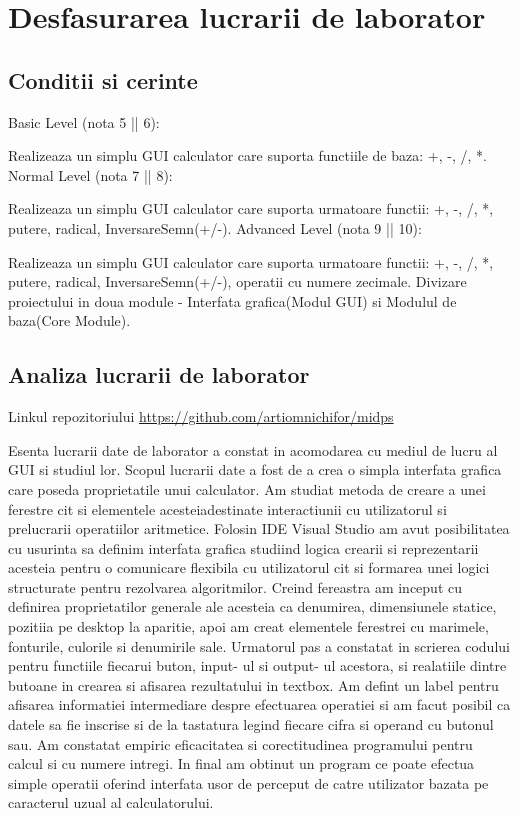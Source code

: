 \section{Desfasurarea lucrarii de laborator}

\subsection{Conditii si cerinte}

Basic Level (nota 5 || 6):

Realizeaza un simplu GUI calculator care suporta functiile de baza: +, -, /, *.
Normal Level (nota 7 || 8):

Realizeaza un simplu GUI calculator care suporta urmatoare functii: +, -, /, *, putere, radical, InversareSemn(+/-).
Advanced Level (nota 9 || 10):

Realizeaza un simplu GUI calculator care suporta urmatoare functii: +, -, /, *, putere, radical, InversareSemn(+/-), operatii cu numere zecimale.
Divizare proiectului in doua module - Interfata grafica(Modul GUI) si Modulul de baza(Core Module).

\subsection{Analiza lucrarii de laborator}
	Linkul repozitoriului  \url{https://github.com/artiomnichifor/midps}

	Esenta lucrarii date de laborator a constat in acomodarea cu mediul de lucru al GUI si studiul lor. Scopul lucrarii date a fost de a crea o simpla interfata grafica care poseda proprietatile unui calculator. Am studiat metoda de creare a unei ferestre cit si elementele acesteiadestinate interactiunii cu utilizatorul si prelucrarii operatiilor aritmetice. Folosin IDE Visual Studio am avut posibilitatea cu usurinta sa definim interfata grafica studiind logica crearii si reprezentarii acesteia pentru o comunicare flexibila cu utilizatorul cit si formarea unei logici structurate pentru rezolvarea algoritmilor. Creind fereastra am inceput cu definirea proprietatilor generale ale acesteia ca denumirea, dimensiunele statice, pozitiia pe desktop la aparitie, apoi am creat elementele ferestrei cu marimele, fonturile, culorile si denumirile sale. Urmatorul pas a constatat in scrierea codului pentru functiile fiecarui buton, input- ul si output- ul acestora, si realatiile dintre butoane in crearea si afisarea rezultatului in textbox. Am defint un label pentru afisarea informatiei intermediare despre efectuarea operatiei si am facut posibil ca datele sa fie inscrise si de la tastatura legind fiecare cifra si operand cu butonul sau. Am constatat empiric eficacitatea si corectitudinea programului pentru calcul si cu numere intregi. In final am obtinut un program ce poate efectua simple operatii oferind interfata usor de perceput de catre utilizator bazata pe caracterul uzual al
calculatorului.





